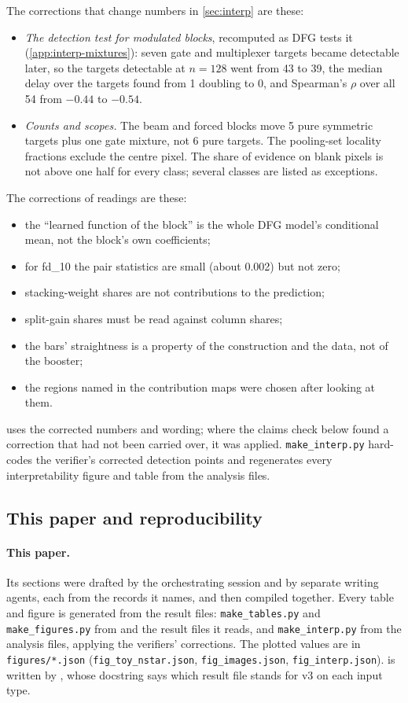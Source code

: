 The corrections that change numbers in \cref{sec:interp} are these:
\begin{itemize}
\item \emph{The detection test for modulated blocks}, recomputed as DFG tests it (\cref{app:interp-mixtures}): seven gate and multiplexer targets became detectable later, so the targets detectable at $n=128$ went from 43 to 39, the median delay over the targets found from 1 doubling to 0, and Spearman's $\rho$ over all 54 from $-0.44$ to $-0.54$.
\item \emph{Counts and scopes.} The beam and forced blocks move 5 pure symmetric targets plus one gate mixture, not 6 pure targets. The pooling-set locality fractions exclude the centre pixel. The share of evidence on blank pixels is not above one half for every class; several classes are listed as exceptions.
\end{itemize}
The corrections of readings are these:
\begin{itemize}
\item the ``learned function of the block'' is the whole DFG model's conditional mean, not the block's own coefficients;
\item for fd\_10 the pair statistics are small (about 0.002) but not zero;
\item stacking-weight shares are not contributions to the prediction;
\item split-gain shares must be read against column shares;
\item the bars' straightness is a property of the construction and the data, not of the booster;
\item the regions named in the contribution maps were chosen after looking at them.
\end{itemize}
 uses the corrected numbers and wording; where the claims check below found a correction that had not been carried over, it was applied. \texttt{make\_interp.py} hard-codes the verifier's corrected detection points and regenerates every interpretability figure and table from the analysis files.

\subsection{This paper and reproducibility}\label{app:repro}

\paragraph{This paper.} Its sections were drafted by the orchestrating session and by separate writing agents, each from the records it names, and then compiled together. Every table and figure is generated from the result files: \texttt{make\_tables.py} and \texttt{make\_figures.py} from  and the result files it reads, and \texttt{make\_interp.py} from the analysis files, applying the verifiers' corrections. The plotted values are in \texttt{figures/*.json} (\texttt{fig\_toy\_nstar.json}, \texttt{fig\_images.json}, \texttt{fig\_interp.json}).  is written by , whose docstring says which result file stands for v3 on each input type.

